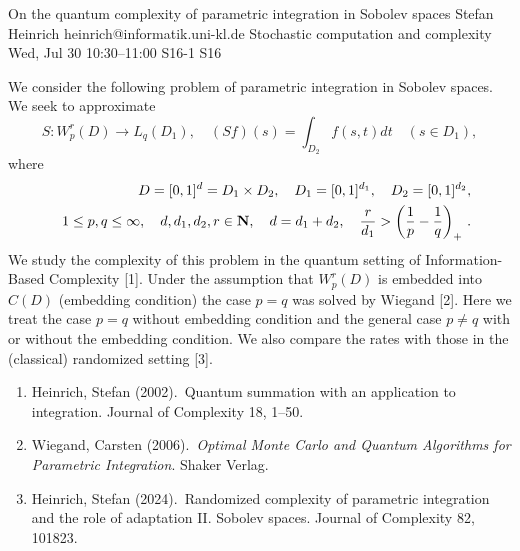 \begin{talk}
  {On the quantum complexity of parametric integration in Sobolev spaces}%
  {Stefan Heinrich}%
  {heinrich@informatik.uni-kl.de}%
  {Stochastic computation and complexity}%
  {}%
  {}%
  {Wed, Jul 30 10:30--11:00}%
  {S16-1}%
  {S16}%
    
   
We consider the following problem of parametric integration in Sobolev spaces. We seek to approximate
$$
S:W_p^r(D)\to L_q(D_1), \quad (Sf)(s)=\int_{D_2}f(s,t)dt \quad (s\in D_1),
$$ 
where 
%
\begin{eqnarray*}
&&D=[0,1]^d=D_1\times D_2,\quad D_1=[0,1]^{d_1}, \quad D_2=[0,1]^{d_2}, 
\\
&&1\le p,q\le \infty, \quad d,d_1,d_2,r\in {\bf N},\quad d=d_1+d_2,\quad \frac{r}{d_1}>\left(\frac{1}{p}-\frac{1}{q}\right)_+\, .
\end{eqnarray*}
%
We study the complexity of this problem in the quantum setting of Information-Based Complexity [1]. Under the assumption that $W_p^r(D)$ is embedded into $C(D)$ (embedding condition) the case $p=q$ was solved by Wiegand [2]. Here we treat the case $p=q$ without embedding condition and the general case $p\ne q$ with or without the embedding condition. We also compare the rates with those in the (classical) randomized setting [3].


\medskip

\begin{enumerate}

\item[{[1]}] Heinrich, Stefan (2002).\  Quantum summation with an application to integration. 
Journal of Complexity 18, 1--50.
\item[{[2]}] Wiegand, Carsten (2006).\ {\it Optimal Monte Carlo and Quantum Algorithms for Parametric Integration}. Shaker Verlag.
\item[{[3]}] Heinrich, Stefan (2024).\  Randomized complexity of parametric integration and
the role of adaptation  II. Sobolev spaces. Journal of Complexity 82, 101823.
\end{enumerate}

\end{talk}

